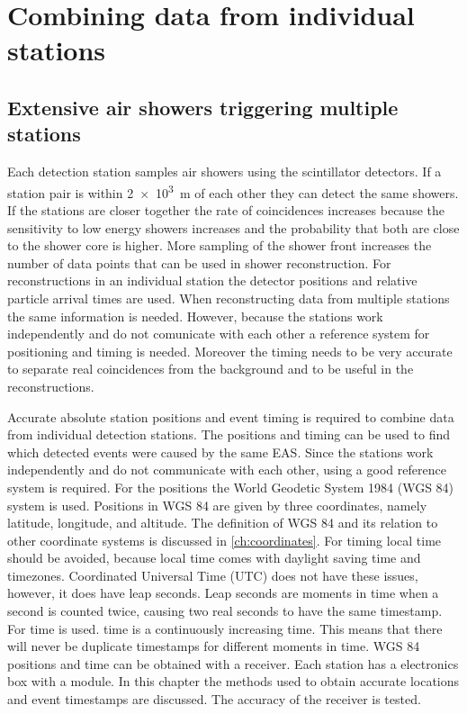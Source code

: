 \chapter{Combining data from individual stations}
\label{ch:cluster}


\section{Extensive air showers triggering multiple stations}

Each detection station samples air showers using the scintillator detectors. If a station pair is within \SI{2e3}{\meter} of each other they can detect the same showers. If the stations are closer together the rate of coincidences increases because the sensitivity to low energy showers increases and the probability that both are close to the shower core is higher. More sampling of the shower front increases the number of data points that can be used in shower reconstruction. For reconstructions in an individual station the detector positions and relative particle arrival times are used. When reconstructing data from multiple stations the same information is needed. However, because the stations work independently and do not comunicate with each other a reference system for positioning and timing is needed. Moreover the timing needs to be very accurate to separate real coincidences from the background and to be useful in the reconstructions.

Accurate absolute station positions and event timing is required to combine data from individual detection stations. The positions and timing can be used to find which detected events were caused by the same EAS. Since the stations work independently and do not communicate with each other, using a good reference system is required. For the positions the World Geodetic System 1984 (WGS 84) system is used. Positions in WGS 84 are given by three coordinates, namely latitude, longitude, and altitude. The definition of WGS 84 and its relation to other coordinate systems is discussed in \cref{ch:coordinates}. For timing local time should be avoided, because local time comes with daylight saving time and timezones. Coordinated Universal Time (UTC) does not have these issues, however, it does have leap seconds. Leap seconds are moments in time when a second is counted twice, causing two real seconds to have the same timestamp. For \hisparc \gps time is used. \gps time is a continuously increasing time. This means that there will never be duplicate timestamps for different moments in time. WGS 84 positions and \gps time can be obtained with a \gps receiver. Each station has a \hisparc electronics box with a \gps module. In this chapter the methods used to obtain accurate \gps locations and event timestamps are discussed. The accuracy of the \gps receiver is tested.


